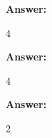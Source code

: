 \documentclass[12pt,twoside]{article}
\newcommand{\answer}{
 \par\medskip
 \textbf{Answer:}
}
\newcommand{\answerIk}{ \answer
4
}
\newcommand{\answerIl}{ \answer
4
}
\newcommand{\answerIm}{ \answer
2
}
\begin{document}
\begin{problems}
\begin{problemparts}
\begin{problemparts}
\answerIk

\answerIl

\end{problemparts}

%

\begin{problemparts}
\answerIm


\end{problemparts}
\end{problemparts}
\end{problems}
\end{document}
